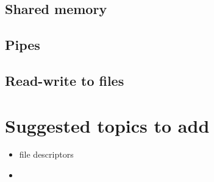 \documentclass[12pt]{article}
\begin{document}
\subsection{Shared memory}
\subsection{Pipes}
\subsection{Read-write to files}



\section{Suggested topics to add}
\begin{itemize}
  \item file descriptors
  \item 
\end{itemize}
\end{document}
